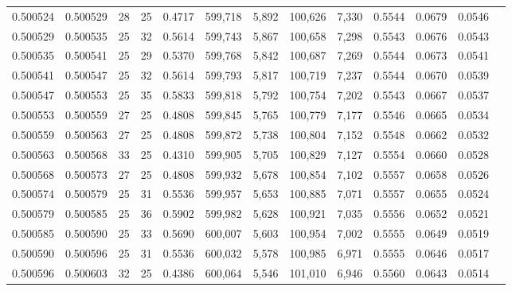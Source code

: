 \begin{tabular}{rrrrrrrrrrrrr}
0.500524 & 0.500529 &    28 &  25 &                                     0.4717 & 599,718 &   5,892 & 100,626 &   7,330 & 0.5544 & 0.0679 & 0.0546 \\
0.500529 & 0.500535 &    25 &  32 &                                     0.5614 & 599,743 &   5,867 & 100,658 &   7,298 & 0.5543 & 0.0676 & 0.0543 \\
0.500535 & 0.500541 &    25 &  29 &                                     0.5370 & 599,768 &   5,842 & 100,687 &   7,269 & 0.5544 & 0.0673 & 0.0541 \\
0.500541 & 0.500547 &    25 &  32 &                                     0.5614 & 599,793 &   5,817 & 100,719 &   7,237 & 0.5544 & 0.0670 & 0.0539 \\
0.500547 & 0.500553 &    25 &  35 &                                     0.5833 & 599,818 &   5,792 & 100,754 &   7,202 & 0.5543 & 0.0667 & 0.0537 \\
0.500553 & 0.500559 &    27 &  25 &                                     0.4808 & 599,845 &   5,765 & 100,779 &   7,177 & 0.5546 & 0.0665 & 0.0534 \\
0.500559 & 0.500563 &    27 &  25 &                                     0.4808 & 599,872 &   5,738 & 100,804 &   7,152 & 0.5548 & 0.0662 & 0.0532 \\
0.500563 & 0.500568 &    33 &  25 &                                     0.4310 & 599,905 &   5,705 & 100,829 &   7,127 & 0.5554 & 0.0660 & 0.0528 \\
0.500568 & 0.500573 &    27 &  25 &                                     0.4808 & 599,932 &   5,678 & 100,854 &   7,102 & 0.5557 & 0.0658 & 0.0526 \\
0.500574 & 0.500579 &    25 &  31 &                                     0.5536 & 599,957 &   5,653 & 100,885 &   7,071 & 0.5557 & 0.0655 & 0.0524 \\
0.500579 & 0.500585 &    25 &  36 &                                     0.5902 & 599,982 &   5,628 & 100,921 &   7,035 & 0.5556 & 0.0652 & 0.0521 \\
0.500585 & 0.500590 &    25 &  33 &                                     0.5690 & 600,007 &   5,603 & 100,954 &   7,002 & 0.5555 & 0.0649 & 0.0519 \\
0.500590 & 0.500596 &    25 &  31 &                                     0.5536 & 600,032 &   5,578 & 100,985 &   6,971 & 0.5555 & 0.0646 & 0.0517 \\
0.500596 & 0.500603 &    32 &  25 &                                     0.4386 & 600,064 &   5,546 & 101,010 &   6,946 & 0.5560 & 0.0643 & 0.0514 \\

\end{tabular}
